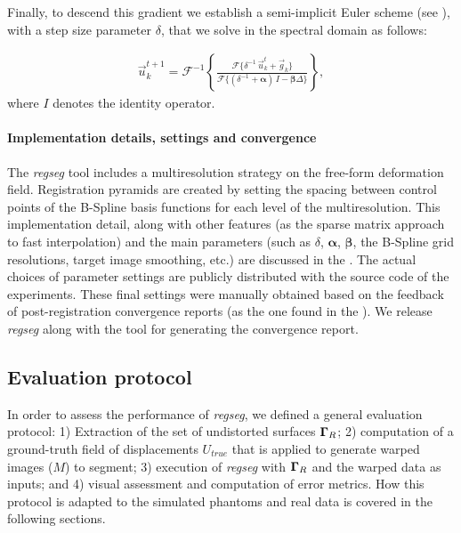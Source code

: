 Finally, to descend this gradient we establish a semi-implicit Euler scheme (see ),
  with a step size parameter $\delta$, that we solve in the spectral domain as follows:

  \begin{align}
  \vec{u}_k^{t+1} = \mathcal{F}^{-1}\left\{ \frac{\mathcal{F}\{\delta^{-1} \, \vec{u}_k^t + \vec{g}_k\} }%
                  {\mathcal{F}\{(\delta^{-1} + \boldsymbol{\alpha})\, I - \boldsymbol{\beta}\Delta\}} \right\},
  \label{eq:update_equation}
  \end{align}
  where $I$ denotes the identity operator.


\paragraph*{Implementation details, settings and convergence}
\label{sec:conv_report}
The \emph{regseg} tool includes a multiresolution strategy on the free-form deformation field.
Registration pyramids are created by setting the spacing between control points of the B-Spline basis
  functions for each level of the multiresolution.
This implementation detail, along with other features (as the sparse matrix approach
  to fast interpolation) and the main parameters 
  (such as $\delta$, $\boldsymbol{\alpha}$, $\boldsymbol{\beta}$, the B-Spline grid resolutions,
  target image smoothing, etc.) are discussed in the .
The actual choices of parameter settings are publicly distributed with the source code of the experiments.
These final settings were manually obtained based on the feedback of post-registration convergence
  reports (as the one found in the ).
We release \emph{regseg} along with the tool for generating the convergence report.

\subsection{Evaluation protocol}\label{sec:evaluation_protocol}
In order to assess the performance of \emph{regseg}, we defined a general
  evaluation protocol:
1) Extraction of the set of undistorted surfaces $\boldsymbol{\Gamma}_R$;
2) computation of a ground-truth field of displacements $U_{true}$ that is applied to
  generate warped images ($M$) to segment;
3) execution of \emph{regseg} with $\boldsymbol{\Gamma}_R$ and the warped data as inputs; and
4) visual assessment and computation of error metrics.
How this protocol is adapted to the simulated phantoms and real data is covered in the
  following sections.

